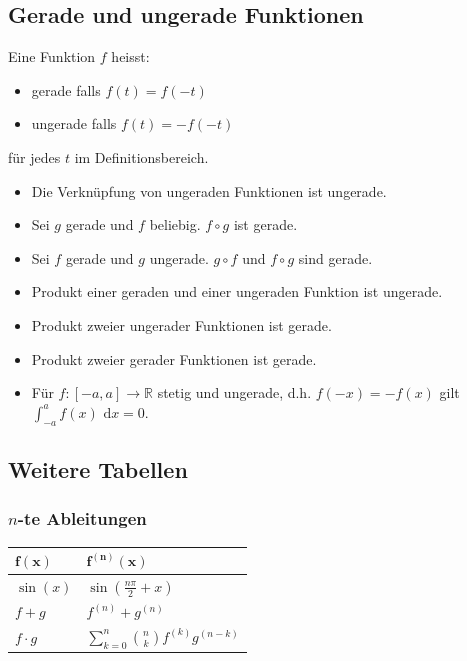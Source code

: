 \documentclass[a4paper,10pt]{article}
\def\dx{\text{ d}x}
\begin{document}
\subsection{Gerade und ungerade Funktionen}

Eine Funktion $f$ heisst:

\begin{itemize}
  \item gerade falls $f(t) = f(-t)$
  \item ungerade falls $f(t) = -f(-t)$
\end{itemize}

für jedes $t$ im Definitionsbereich.

\begin{itemize}
  \item Die Verknüpfung von ungeraden Funktionen ist ungerade. 
  \item Sei $g$ gerade und $f$ beliebig. $f \circ g$ ist gerade.
  \item Sei $f$ gerade und $g$ ungerade. $g \circ f$ und $f \circ g$ sind gerade.
  \item Produkt einer geraden und einer ungeraden Funktion ist ungerade.
  \item Produkt zweier ungerader Funktionen ist gerade.
  \item Produkt zweier gerader Funktionen ist gerade.
  \item Für $f: [-a, a] \to \mathbb{R}$ stetig und ungerade, d.h. $f(-x) = -f(x)$ gilt $\int_{-a}^a f(x) \dx = 0$.
\end{itemize}


\subsection{Weitere Tabellen}

\subsubsection{$n$-te Ableitungen}
\begin{center}
  \begin{tabularx}{\linewidth}{>{\centering\arraybackslash}X>{\centering\arraybackslash}X}
  \toprule
  $\mathbf{f(x)}$ & $\mathbf{f^{(n)}(x)}$ \\
  \midrule
  $\sin(x)$ & $\sin(\frac{n\pi}{2} + x)$\\
  $f + g$ & $f^{(n)} + g^{(n)}$\\
  $f \cdot g$ & $\sum\limits_{k=0}^{n}\binom{n}{k}f^{(k)}g^{(n-k)}$\\
  \bottomrule
  \end{tabularx}
\end{center}
\end{document}
